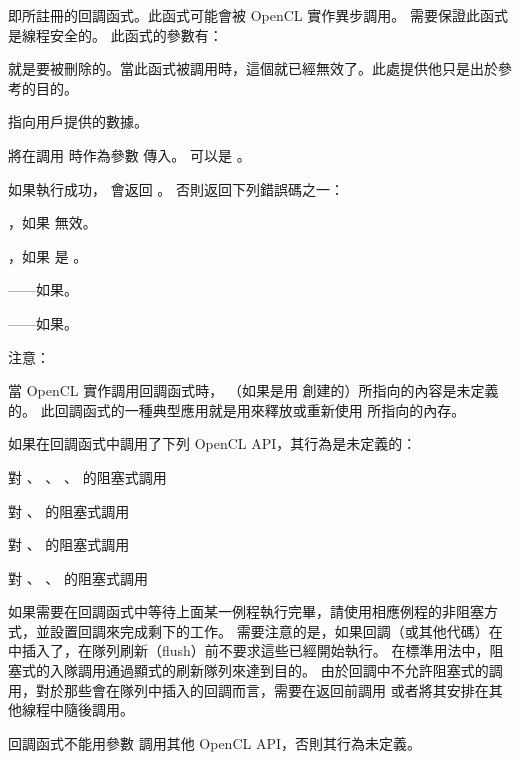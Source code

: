  即所註冊的回調函式。此函式可能會被 OpenCL 實作異步調用。
需要保證此函式是線程安全的。
此函式的參數有：
\startigBase
\item {} 就是要被刪除的。當此函式被調用時，這個就已經無效了。此處提供他只是出於參考的目的。

\item {} 指向用戶提供的數據。
\stopigBase

 將在調用  時作為參數  傳入。
  可以是 。

如果執行成功，  會返回 。
否則返回下列錯誤碼之一：
\startigBase
\item {}，如果  無效。

\item {}，如果  是 。

\item {}——如果\scdevfailres。

\item {}——如果\schostfailres。
\stopigBase

注意：

當 OpenCL 實作調用回調函式時，  （如果是用  創建的）所指向的內容是未定義的。
此回調函式的一種典型應用就是用來釋放或重新使用  所指向的內存。

如果在回調函式中調用了下列 OpenCL API，其行為是未定義的：
\startigBase
\item {}
\item {}
\item 對 、 、 、  的阻塞式調用
\item 對 、  的阻塞式調用
\item 對 、  的阻塞式調用
\item 對 、 、  的阻塞式調用
\stopigBase

如果需要在回調函式中等待上面某一例程執行完畢，請使用相應例程的非阻塞方式，並設置回調來完成剩下的工作。
需要注意的是，如果回調（或其他代碼）在中插入了，在隊列刷新（flush）前不要求這些已經開始執行。
在標準用法中，阻塞式的入隊調用通過顯式的刷新隊列來達到目的。
由於回調中不允許阻塞式的調用，對於那些會在隊列中插入的回調而言，需要在返回前調用  或者將其安排在其他線程中隨後調用。

回調函式不能用參數  調用其他 OpenCL API，否則其行為未定義。

